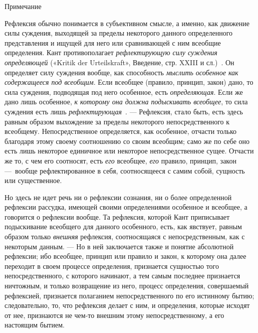 {\centering
Примечание
\par}

Рефлексия обычно понимается в субъективном смысле, а именно, как движение
силы суждения, выходящей за пределы некоторого данного определенного
представления и ищущей для него или сравнивающей с ним всеобщие
определения. Кант противополагает {\em рефлектирующую
силу суждения определяющей} («Kritik der Urteilskraft», Введение, стр.
XXIII и
сл.)~.
Он определяет силу суждения вообще, как способность
{\em мыслить особенное как содержащееся под всеобщим}.
Если всеобщее (правило, принцип, закон) дано, то сила суждения, подводящая
под него особенное, есть {\em определяющая}. Если же
дано лишь особенное, {\em к которому она должна
подыскивать всеобщее}, то сила суждения есть лишь
{\em рефлектирующая}~.
— Рефлексия, стало быть, есть здесь равным образом выхождение за пределы
некоторого непосредственного к всеобщему. Непосредственное определяется,
как особенное, отчасти только благодаря этому своему соотношению со своим
всеобщим; само же по себе оно есть лишь некоторое единичное или некоторое
непосредственное сущее. Отчасти же то, с чем его соотносят, есть
{\em его} всеобщее, {\em его}
правило, принцип, закон —~вообще рефлектированное в себя, соотносящееся с
самим собой, сущность или существенное.

Но здесь не идет речь ни о рефлексии сознания, ни о более определенной
рефлексии рассудка, имеющей своими определениями особенное и всеобщее, а
говорится о рефлексии вообще. Та рефлексия, которой Кант приписывает
подыскивание всеобщего для данного особенного, есть, как явствует, равным
образом только {\em внешняя} рефлексия, соотносящаяся с
непосредственным, как с некоторым данным. — Но в ней заключается также и
понятие абсолютной рефлексии; ибо всеобщее, принцип или правило и закон, к
которому она далее переходит в своем процессе определения, признается
сущностью того непосредственного, с которого начинают, а тем самым
последнее признается ничтожным, и только возвращение из него, процесс
определения, совершаемый рефлексией, признается полаганием
непосредственного по его истинному бытию; следовательно, то, что рефлексия
делает с ним, и определения, которые исходят от нее, признаются не чем-то
внешним этому непосредственному, а его настоящим бытием.

